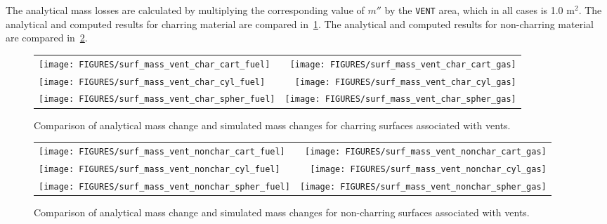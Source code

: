 \documentclass[11pt]{book}
\newcommand{\ct}{\tt\small}
\begin{document}
The analytical mass losses are calculated by multiplying the corresponding value of $m''$ by the {\ct VENT} area,
which in all cases is 1.0 m$^2$.
The analytical and computed results for charring material are compared in~\ref{surf_mass_vent_char}.
The analytical and computed results for non-charring material are compared in~\ref{surf_mass_vent_nonchar}.
\begin{figure}[ht!]
\noindent
\begin{tabular*}{\textwidth}{l@{\extracolsep{\fill}}r}
\texttt{[image: FIGURES/surf\_mass\_vent\_char\_cart\_fuel]} &
\texttt{[image: FIGURES/surf\_mass\_vent\_char\_cart\_gas]} \\
\texttt{[image: FIGURES/surf\_mass\_vent\_char\_cyl\_fuel]} &
\texttt{[image: FIGURES/surf\_mass\_vent\_char\_cyl\_gas]} \\
\texttt{[image: FIGURES/surf\_mass\_vent\_char\_spher\_fuel]} &
\texttt{[image: FIGURES/surf\_mass\_vent\_char\_spher\_gas]}
\end{tabular*}
\caption[The {\bf surf\_mass\_vent\_X\_char\_X} test cases.]{Comparison of analytical mass change and simulated mass changes for charring surfaces associated with vents.}
\label{surf_mass_vent_char}
\end{figure}

\begin{figure}[ht!]
\noindent
\begin{tabular*}{\textwidth}{l@{\extracolsep{\fill}}r}
\texttt{[image: FIGURES/surf\_mass\_vent\_nonchar\_cart\_fuel]} &
\texttt{[image: FIGURES/surf\_mass\_vent\_nonchar\_cart\_gas]} \\
\texttt{[image: FIGURES/surf\_mass\_vent\_nonchar\_cyl\_fuel]} &
\texttt{[image: FIGURES/surf\_mass\_vent\_nonchar\_cyl\_gas]} \\
\texttt{[image: FIGURES/surf\_mass\_vent\_nonchar\_spher\_fuel]} &
\texttt{[image: FIGURES/surf\_mass\_vent\_nonchar\_spher\_gas]}
\end{tabular*}
\caption[The {\bf surf\_mass\_vent\_X\_nonchar\_X} test cases.]{Comparison of analytical mass change and simulated mass changes for non-charring surfaces associated with vents.}
\label{surf_mass_vent_nonchar}
\end{figure}

\clearpage
\end{document}

